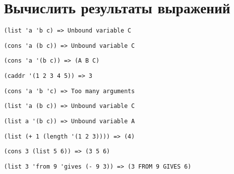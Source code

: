 \newpage
\section{Вычислить результаты выражений}

\problem \hfill

\begin{lstlisting}
(list 'a 'b c) => Unbound variable C
\end{lstlisting}


\problem \hfill

\begin{lstlisting}
(cons 'a (b c)) => Unbound variable C
\end{lstlisting}


\problem \hfill

\begin{lstlisting}
(cons 'a '(b c)) => (A B C) 
\end{lstlisting}


\problem \hfill

\begin{lstlisting}
(caddr '(1 2 3 4 5)) => 3
\end{lstlisting}


\problem \hfill

\begin{lstlisting}
(cons 'a 'b 'c) => Too many arguments
\end{lstlisting}


\problem \hfill

\begin{lstlisting}
(list 'a (b c)) => Unbound variable C
\end{lstlisting}


\problem \hfill

\begin{lstlisting}
(list a '(b c)) => Unbound variable A
\end{lstlisting}


\problem \hfill

\begin{lstlisting}
(list (+ 1 (length '(1 2 3)))) => (4) 
\end{lstlisting}


\problem \hfill

\begin{lstlisting}
(cons 3 (list 5 6)) => (3 5 6)
\end{lstlisting}


\problem \hfill

\begin{lstlisting}
(list 3 'from 9 'gives (- 9 3)) => (3 FROM 9 GIVES 6) 
\end{lstlisting}



